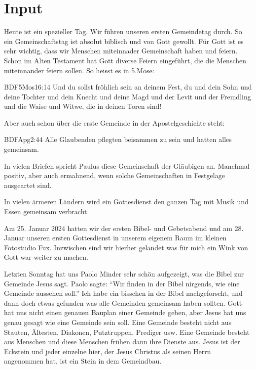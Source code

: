 \documentclass{../../inc/mybib}
\begin{document}
\section{ Input }
\begin{spacing}{1.5}
    Heute ist ein spezieller Tag. Wir führen unseren ersten Gemeindetag durch. So ein Gemeinschaftstag ist absolut biblisch und von Gott gewollt. Für Gott ist es sehr wichtig, dass wir Menschen miteinnader Gemeinschaft haben und feiern. Schon im Alten Testament hat Gott diverse Feiern eingeführt, die die Menschen miteinnander feiern sollen. So heisst es in 5.Mose:
\begin{bibelbox}{BDF}{5Mos}{16:14}
    Und du sollst fröhlich sein an deinem Fest, du und dein Sohn und deine Tochter und dein Knecht und deine Magd und der Levit und der Fremdling und die Waise und Witwe, die in deinen Toren sind!
\end{bibelbox}
Aber auch schon über die erste Gemeinde in der Apostelgeschichte steht:
\begin{bibelbox}{BDF}{Apg}{2:44}
    Alle Glaubenden pflegten beisammen zu sein und hatten alles gemeinsam.
\end{bibelbox}
In vielen Briefen spricht Paulus diese Gemeinschaft der Gläubigen an. Manchmal positiv, aber auch ermahnend, wenn solche Gemeinschaften in Festgelage ausgeartet sind.

In vielen ärmeren Ländern wird ein Gottesdienst den ganzen Tag mit Musik und Essen gemeinsam verbracht.

Am 25. Januar 2024 hatten wir der ersten Bibel- und Gebetsabend und am 28. Januar unseren ersten Gottesdienst in unserem eigenem Raum im kleinen Fotostudio Fux. Inzwischen sind wir hierher gelandet was für mich ein Wink von Gott war weiter zu machen.

Letzten Sonntag hat uns Paolo Minder sehr schön aufgezeigt, was die Bibel zur Gemeinde Jesus sagt. Paolo sagte: \enquote{Wir finden in der Bibel nirgends, wie eine Gemeinde aussehen soll.} Ich habe ein bisschen in der Bibel nachgeforscht, und dann doch etwas gefunden was alle Gemeinden gemeinsam haben sollten. Gott hat uns nicht einen genauen Bauplan einer Gemeinde geben, aber Jesus hat uns genau gesagt wie eine Gemeinde sein soll. Eine Gemeinde besteht nicht aus Stauten, Ältesten, Diakonen, Putztruppen, Prediger usw. Eine Gemeinde besteht aus Menschen und diese Menschen frühen dann ihre Dienste aus. Jesus ist der Eckstein und jeder einzelne hier, der Jesus Christus als seinen Herrn angenommen hat, ist ein Stein in dem Gemeindbau. 


\end{spacing}
\end{document}
